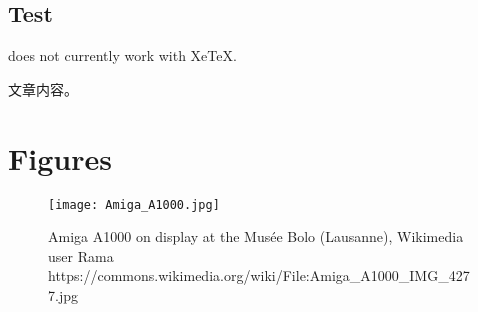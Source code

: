 \documentclass{jlcl}
\begin{document}
\subsection{Test}

\ifxetex
does not currently work with XeTeX.
\else
\begin{CJK*}{UTF8}{gbsn}
文章内容。
\end{CJK*}
\fi


\section{Figures}

\begin{figure}[h]
\centering
\texttt{[image: Amiga\_A1000.jpg]}
\caption{Amiga A1000 on display at the Mus\'{e}e Bolo (Lausanne), Wikimedia user Rama \newline https://commons.wikimedia.org/wiki/File:Amiga\_A1000\_IMG\_4277.jpg}
\end{figure}



\nocite{*}



\end{document}

